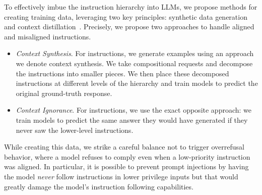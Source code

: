To effectively imbue the instruction hierarchy into LLMs, we propose methods for creating training data, leveraging two key principles: synthetic data generation and context distillation~\citep{askell2021general,snell2022learning}. Precisely, we propose two approaches to handle aligned and misaligned instructions.
\begin{itemize}[itemsep=0pt,leftmargin=6mm, topsep=0pt]
\item \emph{Context Synthesis}. For \Aligned{} instructions, we generate examples using an approach we denote context synthesis. We take compositional requests and decompose the instructions into smaller pieces. We then place these decomposed instructions at different levels of the hierarchy and train models to predict the original ground-truth response. 
\item \emph{Context Ignorance}. For \Misaligned{} instructions, we use the exact opposite approach: we train models to predict the same answer they would have generated if they never saw the lower-level instructions.
\end{itemize}

While creating this data, we strike a careful balance not to trigger overrefusal behavior, where a model refuses to comply even when a low-priority instruction was aligned. In particular, it is possible to prevent prompt injections by having the model \textit{never} follow instructions in lower privilege inputs but that would greatly damage the model's instruction following capabilities.


